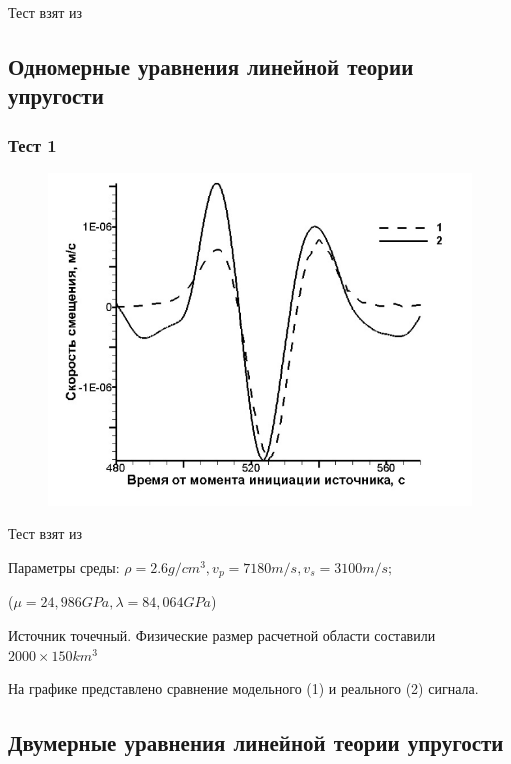 \documentclass{article}
\begin{document}
Тест взят из \cite{manuscript}

\newpage
\subsection{Одномерные уравнения линейной теории упругости}

\subsubsection{Тест 1}

\begin{figure}
  \begin{center}
    \includegraphics[scale=0.4]{1D_seismic_test/chel.PNG}
  \end{center}
\end{figure}


Тест взят из \cite{petrov}

Параметры среды: $\rho = 2.6 g/cm^3, {v}_p = 7180 m/s, {v}_s = 3100 m/s;$

($\mu = 24,986 GPa, \lambda = 84,064 GPa$)

Источник точечный.
Физические размер  расчетной области составили $2000\times150 km^3 $

На графике представлено сравнение модельного (1) и реального (2) сигнала.


\newpage
\subsection{Двумерные уравнения линейной теории упругости}
\end{document}
